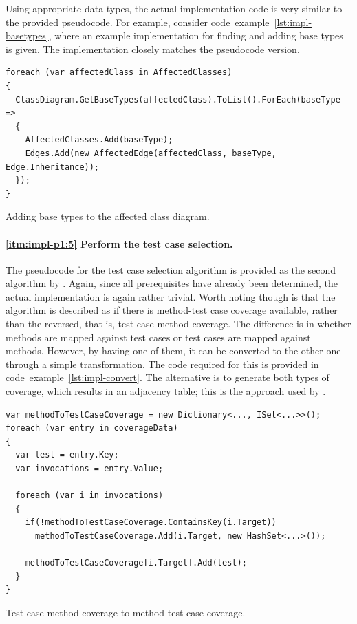 \documentclass[a4paper,english,12pt]{report}
\begin{document}
Using appropriate data types, the actual implementation code is very similar to the provided pseudocode. For example, consider code~example~\ref{lst:impl-basetypes}, where an example implementation for finding and adding base types is given. The implementation closely matches the pseudocode version.

\begin{listing}[htbp]
{\footnotesize
\begin{verbatim}
foreach (var affectedClass in AffectedClasses)
{
  ClassDiagram.GetBaseTypes(affectedClass).ToList().ForEach(baseType =>
  {
    AffectedClasses.Add(baseType);
    Edges.Add(new AffectedEdge(affectedClass, baseType, Edge.Inheritance));
  });
}
\end{verbatim}
}
\caption{Adding base types to the affected class diagram.}
\label{lst:impl-basetypes}
\end{listing}

\paragraph{\ref{itm:impl-p1:5} Perform the test case selection.}
The pseudocode for the test case selection algorithm is provided as the second algorithm by \citet[p. 5]{mansour2009regression}. Again, since all prerequisites have already been determined, the actual implementation is again rather trivial. Worth noting though is that the algorithm is described as if there is method-test case coverage available, rather than the reversed, that is, test case-method coverage. The difference is in whether methods are mapped against test cases or test cases are mapped against methods. However, by having one of them, it can be converted to the other one through a simple transformation. The code required for this is provided in code~example~\vref{lst:impl-convert}. The alternative is to generate both types of coverage, which results in an adjacency table; this is the approach used by \citet{mansour2009regression}.

\begin{listing}[htbp]
{\footnotesize
\begin{verbatim}
var methodToTestCaseCoverage = new Dictionary<..., ISet<...>>();
foreach (var entry in coverageData)
{
  var test = entry.Key;
  var invocations = entry.Value;

  foreach (var i in invocations)
  {
    if(!methodToTestCaseCoverage.ContainsKey(i.Target))
      methodToTestCaseCoverage.Add(i.Target, new HashSet<...>());

    methodToTestCaseCoverage[i.Target].Add(test);
  }
}
\end{verbatim}
}
\caption{Test case-method coverage to method-test case coverage.}
\label{lst:impl-convert}
\end{listing}
\end{document}
